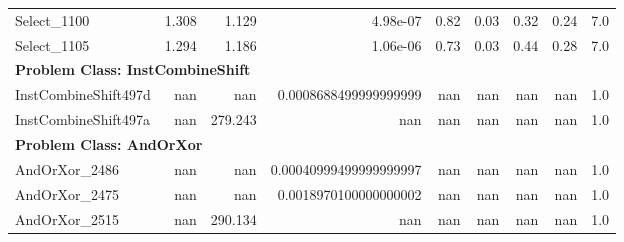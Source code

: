\begin{tabular}{lrrrrrrrr}
\midrule
Select\_1100 & 1.308 & 1.129 & 4.98e-07 & 0.82 & 0.03 & 0.32 & 0.24 & 7.0 \\
Select\_1105 & 1.294 & 1.186 & 1.06e-06 & 0.73 & 0.03 & 0.44 & 0.28 & 7.0 \\
\midrule
\multicolumn{9}{l}{\textbf{Problem Class: InstCombineShift}} \\
\midrule
InstCombineShift497d & nan & nan & 0.0008688499999999999 & nan & nan & nan & nan & 1.0 \\
InstCombineShift497a & nan & 279.243 & nan & nan & nan & nan & nan & 1.0 \\
\midrule
\multicolumn{9}{l}{\textbf{Problem Class: AndOrXor}} \\
\midrule
AndOrXor\_2486 & nan & nan & 0.00040999499999999997 & nan & nan & nan & nan & 1.0 \\
AndOrXor\_2475 & nan & nan & 0.0018970100000000002 & nan & nan & nan & nan & 1.0 \\
AndOrXor\_2515 & nan & 290.134 & nan & nan & nan & nan & nan & 1.0 \\

\end{tabular}
